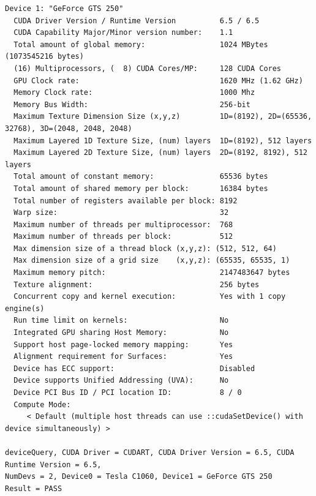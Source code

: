 \begin{Verbatim}[fontsize=\footnotesize,breaklines,breakanywhere,xleftmargin=4pt]
Device 1: "GeForce GTS 250"
  CUDA Driver Version / Runtime Version          6.5 / 6.5
  CUDA Capability Major/Minor version number:    1.1
  Total amount of global memory:                 1024 MBytes (1073545216 bytes)
  (16) Multiprocessors, (  8) CUDA Cores/MP:     128 CUDA Cores
  GPU Clock rate:                                1620 MHz (1.62 GHz)
  Memory Clock rate:                             1000 Mhz
  Memory Bus Width:                              256-bit
  Maximum Texture Dimension Size (x,y,z)         1D=(8192), 2D=(65536, 32768), 3D=(2048, 2048, 2048)
  Maximum Layered 1D Texture Size, (num) layers  1D=(8192), 512 layers
  Maximum Layered 2D Texture Size, (num) layers  2D=(8192, 8192), 512 layers
  Total amount of constant memory:               65536 bytes
  Total amount of shared memory per block:       16384 bytes
  Total number of registers available per block: 8192
  Warp size:                                     32
  Maximum number of threads per multiprocessor:  768
  Maximum number of threads per block:           512
  Max dimension size of a thread block (x,y,z): (512, 512, 64)
  Max dimension size of a grid size    (x,y,z): (65535, 65535, 1)
  Maximum memory pitch:                          2147483647 bytes
  Texture alignment:                             256 bytes
  Concurrent copy and kernel execution:          Yes with 1 copy engine(s)
  Run time limit on kernels:                     No
  Integrated GPU sharing Host Memory:            No
  Support host page-locked memory mapping:       Yes
  Alignment requirement for Surfaces:            Yes
  Device has ECC support:                        Disabled
  Device supports Unified Addressing (UVA):      No
  Device PCI Bus ID / PCI location ID:           8 / 0
  Compute Mode:
     < Default (multiple host threads can use ::cudaSetDevice() with device simultaneously) >

deviceQuery, CUDA Driver = CUDART, CUDA Driver Version = 6.5, CUDA Runtime Version = 6.5,
NumDevs = 2, Device0 = Tesla C1060, Device1 = GeForce GTS 250
Result = PASS
\end{Verbatim}
